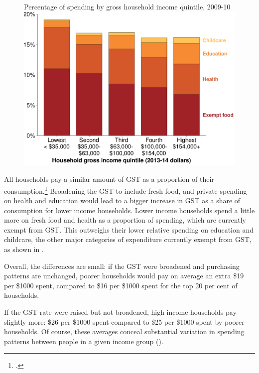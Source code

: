 \begin{figure}
%
{Percentage of spending by gross household income quintile, 2009-10}
\includegraphics[width=\columnwidth]{atlas/figure/GST-Figure-4-1-tikzd.pdf}
\end{figure}

All households pay a similar amount of GST as a proportion of their consumption.\footcite[][41]{OECDKoreaInstitutePublicFinance2014-Distributional-Effects-Consumption-Taxes} Broadening the GST to include fresh food, and private spending on health and education would lead to a bigger increase in GST as a share of consumption for lower income households. Lower income households spend a little more on fresh food and health as a proportion of spending, which are currently exempt from GST\@. This outweighs their lower relative spending on education and childcare, the other major categories of expenditure currently exempt from GST, as shown in .


Overall, the differences are small: if the GST were broadened and purchasing patterns are unchanged, poorer households would pay on average an extra \$19 per \$1000 spent, compared to \$16 per \$1000 spent for the top 20 per cent of households. 

If the GST rate were raised but not broadened, high-income households pay slightly more:  \$26 per \$1000 spent compared to \$25 per \$1000 spent by poorer households. Of course, these averages conceal substantial variation in spending patterns between people in a given income group ().

